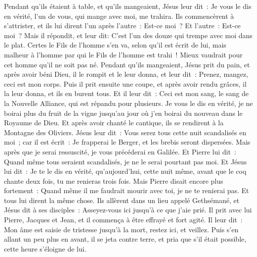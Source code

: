 \begin{multicols}{2}
Pendant qu'ils étaient à table, et qu'ils mangeaient, Jésus leur dit~: Je vous le dis en vérité, l'un de vous, qui mange avec moi, me trahira.
Ils commencèrent à s'attrister, et ils lui dirent l'un après l'autre~: Est-ce moi~? Et l'autre~: Est-ce moi~?
Mais il répondit, et leur dit: C'est l'un des douze qui trempe avec moi dans le plat.
Certes le Fils de l'homme s'en va, selon qu'il est écrit de lui, mais malheur à l'homme par qui le Fils de l'homme est trahi~! Mieux vaudrait pour cet homme qu'il ne soit pas né.
Pendant qu'ils mangeaient, Jésus prit du pain, et après avoir béni Dieu, il le rompit et le leur donna, et leur dit~: Prenez, mangez, ceci est mon corps.
Puis il prit ensuite une coupe, et après avoir rendu grâces, il la leur donna, et ils en burent tous.
Et il leur dit~: Ceci est mon sang, le sang de la Nouvelle Alliance, qui est répandu pour plusieurs.
Je vous le dis en vérité, je ne boirai plus du fruit de la vigne jusqu'au jour où j'en boirai du nouveau dans le Royaume de Dieu.
Et après avoir chanté le cantique, ils se rendirent à la Montagne des Oliviers.
Jésus leur dit~: Vous serez tous cette nuit scandalisés en moi~; car il est écrit~: Je frapperai le Berger, et les brebis seront dispersées.
Mais après que je serai ressuscité, je vous précéderai en Galilée.
Et Pierre lui dit~: Quand même tous seraient scandalisés, je ne le serai pourtant pas moi.
Et Jésus lui dit~: Je te le dis en vérité, qu'aujourd'hui, cette nuit même, avant que le coq chante deux fois, tu me renieras trois fois.
Mais Pierre disait encore plus fortement~: Quand même il me faudrait mourir avec toi, je ne te renierai pas. Et tous lui dirent la même chose.
Ils allèrent dans un lieu appelé Gethsémané, et Jésus dit à ses disciples~: Asseyez-vous ici jusqu'à ce que j'aie prié.
Il prit avec lui Pierre, Jacques et Jean, et il commença à être effrayé et fort agité.
Il leur dit~: Mon âme est saisie de tristesse jusqu'à la mort, restez ici, et veillez.
Puis s'en allant un peu plus en avant, il se jeta contre terre, et pria que s'il était possible, cette heure s'éloigne de lui.

\end{multicols}
